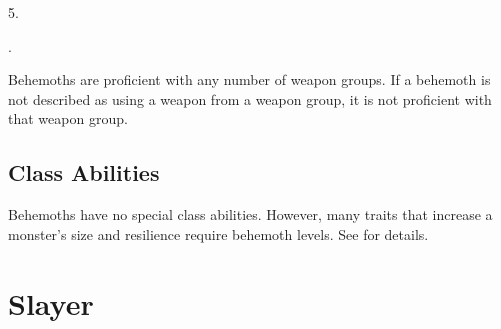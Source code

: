          5.

         .

        Behemoths are proficient with any number of weapon groups.
        If a behemoth is not described as using a weapon from a weapon group, it is not proficient with that weapon group.

    \subsection{Class Abilities}
        Behemoths have no special class abilities.
        However, many traits that increase a monster's size and resilience require behemoth levels.
        See  for details.

\section{Slayer}\label{Slayer}

